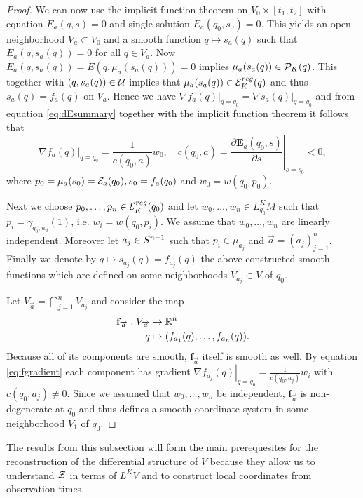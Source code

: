 \begin{proof}
    We can now use the implicit function theorem on $V_0\times [t_1,t_2]$ with equation $E_a(q,s)=0$ and single solution $E_a(q_0,s_0)=0$. This yields an open neighborhood $V_a\subset V_0$ and a smooth function $q\mapsto s_a(q)$ such that $E_a(q,s_a(q)) = 0$ for all $q \in V_a$. Now $E_a(q,s_a(q)) = E(q,\mu_a(s_a(q)))=0$ implies $\mu_a(s_a(q))\in {{\mathcal{P}}_K(q)}$. This together with $(q,s_a(q))\in \mathcal{U}$ implies that $\mu_a(s_a(q))\in {{\mathcal{E}}^{reg}_K}(q)$ and thus $s_a(q) = f_a(q)$ on $V_a$. Hence we have $\left.\nabla f_a(q)\right\rvert_{q=q_0} = \left.\nabla s_a(q)\right\rvert_{q=q_0}$ and from equation \eqref{eq:dEsummary} together with the implicit function theorem it follows that 
    \begin{equation}\label{eq:fgradient}
        \left.\nabla f_a(q)\right\rvert_{q=q_0}  = \frac{1}{c(q_0,a)}w_0, \quad 
        c(q_0,a) = \left.\frac{\partial\mathbf{E}_a(q_0,s)}{\partial s}\right\rvert_{s=s_0} < 0,
    \end{equation}
    where $p_0 = \mu_a(s_0)={\mathcal{E}}_a(q_0), s_0 = f_a(q_0)$ and $w_0=w(q_0,p_0)$.
    
    Next we choose $p_0, \dots, p_n \in {{\mathcal{E}}^{reg}_K}(q_0)$ and let $w_0,\dots,w_n\in L^K_{q_0}M$ such that $p_i = \gamma_{q_0,w_i}(1)$, i.e. $w_i=w(q_0,p_i)$. We assume that $w_0,\dots,w_n$ are linearly independent. Moreover let $a_j \in {S^{n-1}}$ such that $p_i\in \mu_{a_j}$ and $\overrightarrow{a}=(a_j)^n_{j=1}$.
    Finally we denote by $q\mapsto s_{a_j}(q)=f_{a_j}(q)$ the above constructed smooth functions which are defined on some neighborhoods $V_{a_j}\subset V$ of $q_0$.
    
    Let $V_{\overrightarrow{a}} = \bigcap_{j=1}^n V_{a_j}$ and consider the map
    \begin{align*}
        \mathbf{f}_{\overrightarrow{a}}:V_{\overrightarrow{a}}&\to \mathbb{R}^n\\
        q&\mapsto (f_{a_1}(q),\dots,f_{a_n}(q)).
    \end{align*}
    Because all of its components are smooth, $\mathbf{f}_{\overrightarrow{a}}$ itself is smooth as well. By equation \eqref{eq:fgradient} each component has gradient $\left.\nabla f_{a_j}(q)\right\rvert_{q=q_0} = \frac{1}{c(q_0,a_j)}w_i$ with $c(q_0,a_j)\neq 0$. Since we assumed that $w_0,\dots,w_n$ be independent, $\mathbf{f}_{\overrightarrow{a}}$ is non-degenerate at $q_0$ and thus defines a smooth coordinate system in some neighborhood $V_1$  of $q_0$.
\end{proof}
The results from this subsection will form the main prerequesites for the reconstruction of the differential structure of $V$ because they allow us to understand ${\mathcal{Z}}$ in terms of $L^KV$ and to construct local coordinates from observation times.


